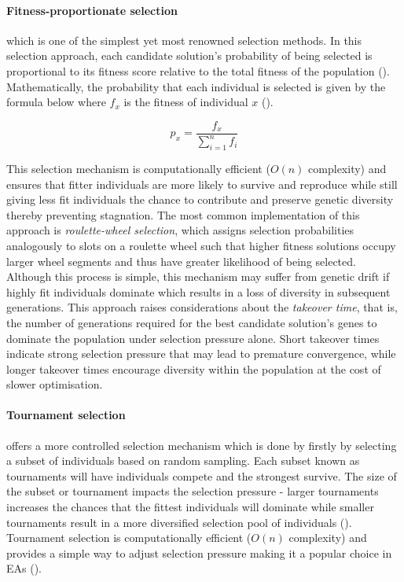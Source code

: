 \parbreak\noindent \paragraph{Fitness-proportionate selection} which is one of the simplest yet most renowned selection methods. In this selection approach, each candidate solution's probability of being selected is proportional to its fitness score relative to the total fitness of the population (\cite{shukla2015comparative}). Mathematically, the probability that each individual is selected is given by the formula below where $f_x$ is the fitness of individual $x$ (\cite{shukla2015comparative}).
\begin{ceqn}
	\begin{equation}
		p_x = \frac{f_x}{\sum^{n}_{i=1}f_i}
	\end{equation}
\end{ceqn}
This selection mechanism is computationally efficient ($O(n)$ complexity) and ensures that fitter individuals are more likely to survive and reproduce while still giving less fit individuals the chance to contribute and preserve genetic diversity thereby preventing stagnation. The most common implementation of this approach is \textit{roulette-wheel selection}, which assigns selection probabilities analogously to slots on a roulette wheel such that higher fitness solutions occupy larger wheel segments and thus have greater likelihood of being selected. Although this process is simple, this mechanism may suffer from genetic drift if highly fit individuals dominate which results in a loss of diversity in subsequent generations. This approach raises considerations about the \textit{takeover time}, that is, the number of generations required for the best candidate solution's genes to dominate the population under selection pressure alone. Short takeover times indicate strong selection pressure that may lead to premature convergence, while longer takeover times encourage diversity within the population at the cost of slower optimisation.

\parbreak\noindent \paragraph{Tournament selection} offers a more controlled selection mechanism which is done by firstly by selecting a subset of individuals based on random sampling. Each subset known as tournaments will have individuals compete and the strongest survive. The size of the subset or tournament impacts the selection pressure - larger tournaments increases the chances that the fittest individuals will dominate while smaller tournaments result in a more diversified selection pool of individuals (\cite{shukla2015comparative}). Tournament selection is computationally efficient ($O(n)$ complexity) and provides a simple way to adjust selection pressure making it a popular choice in EAs (\cite{shukla2015comparative}).

